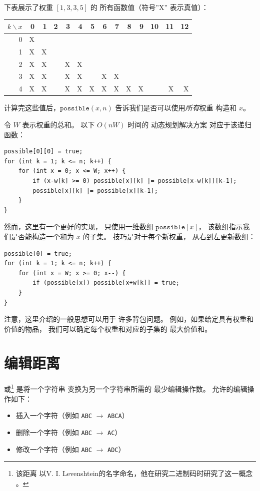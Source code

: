下表展示了权重 $[1,3,3,5]$ 的
所有函数值（符号''X''
表示真值）：

\begin{center}
\begin{tabular}{r|rrrrrrrrrrrrr}
$k \backslash x$ & 0 & 1 & 2 & 3 & 4 & 5 & 6 & 7 & 8 & 9 & 10 & 11 & 12 \\
\hline
 0 & X & \\
 1 & X & X \\
 2 & X & X & & X & X \\
 3 & X & X & & X & X & & X & X \\
 4 & X & X & & X & X & X & X & X & X & X & & X & X \\
\end{tabular}
\end{center}

计算完这些值后，$\texttt{possible}(x,n)$
告诉我们是否可以使用\emph{所有}权重
构造和 $x$。

令 $W$ 表示权重的总和。
以下 $O(nW)$ 时间的
动态规划解决方案
对应于该递归函数：
\begin{lstlisting}
possible[0][0] = true;
for (int k = 1; k <= n; k++) {
    for (int x = 0; x <= W; x++) {
        if (x-w[k] >= 0) possible[x][k] |= possible[x-w[k]][k-1];
        possible[x][k] |= possible[x][k-1];
    }
}
\end{lstlisting}

然而，这里有一个更好的实现，
只使用一维数组 $\texttt{possible}[x]$，
该数组指示我们是否能构造一个和为 $x$ 的子集。
技巧是对于每个新权重，
从右到左更新数组：
\begin{lstlisting}
possible[0] = true;
for (int k = 1; k <= n; k++) {
    for (int x = W; x >= 0; x--) {
        if (possible[x]) possible[x+w[k]] = true;
    }
}
\end{lstlisting}

注意，这里介绍的一般思想可以用于
许多背包问题。
例如，如果给定具有权重和价值的物品，
我们可以确定每个权重和对应的子集的
最大价值和。

\section{编辑距离}


或\footnote{该距离
以V. I. Levenshtein的名字命名，他在研究二进制码时研究了这一概念 \cite{lev66}。}
是将一个字符串
变换为另一个字符串所需的
最少编辑操作数。
允许的编辑操作如下：
\begin{itemize}
\item 插入一个字符（例如 \texttt{ABC} $\rightarrow$ \texttt{ABCA}）
\item 删除一个字符（例如 \texttt{ABC} $\rightarrow$ \texttt{AC}）
\item 修改一个字符（例如 \texttt{ABC} $\rightarrow$ \texttt{ADC}）
\end{itemize}

